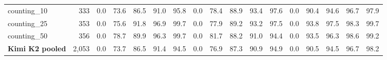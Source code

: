 \begin{table}[h]
\begin{tabular}{l r r r r r r r r r r r r r r r r}
counting\_10 & 333 & 0.0 & 73.6 & 86.5 & 91.0 & 95.8 & 0.0 & 78.4 & 88.9 & 93.4 & 97.6 & 0.0 & 90.4 & 94.6 & 96.7 & 97.9 \\
counting\_25 & 353 & 0.0 & 75.6 & 91.8 & 96.9 & 99.7 & 0.0 & 77.9 & 89.2 & 93.2 & 97.5 & 0.0 & 93.8 & 97.5 & 98.3 & 99.7 \\
counting\_50 & 356 & 0.0 & 78.7 & 89.9 & 96.3 & 99.7 & 0.0 & 81.7 & 88.2 & 91.0 & 94.4 & 0.0 & 93.5 & 96.3 & 98.6 & 99.2 \\
\addlinespace[2pt]
\textbf{Kimi K2 pooled} & 2,053 & 0.0 & 73.7 & 86.5 & 91.4 & 94.5 & 0.0 & 76.9 & 87.3 & 90.9 & 94.9 & 0.0 & 90.5 & 94.5 & 96.7 & 98.2 \\
\bottomrule
\end{tabular}
\end{table}
